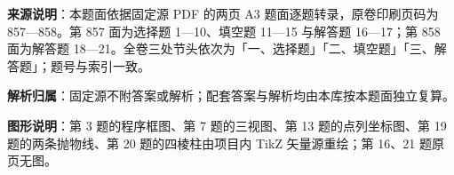 

\begin{gknotice}
\textbf{来源说明}：本题面依据固定源 PDF 的两页 A3 题面逐题转录，原卷印刷页码为 857—858。第 857 面为选择题 1—10、填空题 11—15 与解答题 16—17；第 858 面为解答题 18—21。全卷三处节头依次为「一、选择题」「二、填空题」「三、解答题」；题号与索引一致。

\textbf{解析归属}：固定源不附答案或解析；配套答案与解析均由本库按本题面独立复算。

\textbf{图形说明}：第 3 题的程序框图、第 7 题的三视图、第 13 题的点列坐标图、第 19 题的两条抛物线、第 20 题的四棱柱由项目内 TikZ 矢量源重绘；第 16、21 题原页无图。
\end{gknotice}


